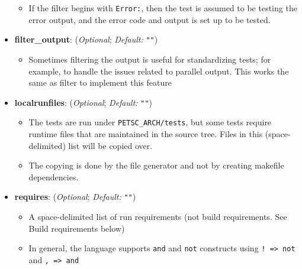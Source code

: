 \begin{itemize}
\begin{itemize}
      \item If the filter begins with \lstinline{Error:}, then the test is
            assumed to be testing the error output, and the error code and
            output is set up to be tested.

      \end{itemize}

    \item[]  \textbf{filter\_output}: (\emph{Optional}; \emph{Default:} \lstinline{""})

      \begin{itemize}

      \item Sometimes filtering the output is useful for standardizing
            tests; for example, to handle the issues related to parallel
            output.  This works the same as filter to implement this
            feature

      \end{itemize}

    \item[]  \textbf{localrunfiles}: (\emph{Optional}; \emph{Default:} \lstinline{""})

      \begin{itemize}

      \item The tests are run under \lstinline{PETSC_ARCH/tests}, but
            some tests require runtime files that are maintained in the
            source tree.  Files in this (space-delimited) list will be
            copied over.

      \item The copying is done by the file generator and not by
            creating makefile dependencies.

      \end{itemize}

    \item[]  \textbf{requires}: (\emph{Optional}; \emph{Default:} \lstinline{""})
      \begin{itemize}

        \item A space-delimited list of run requirements (not
        build requirements. See Build requirements below)

        \item In general, the language supports \lstinline{and} and \lstinline{not} constructs
        using \lstinline{! => not} and \lstinline{, => and}


\end{itemize}
\end{itemize}
